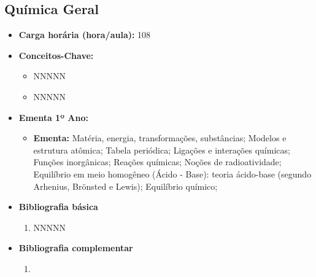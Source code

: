 \documentclass[11pt,fleqn]{book} %
\begin{document}
\subsection{Química Geral}\label{disc:quimica}
\begin{itemize}
	\item \textbf{Carga horária (hora/aula):} 108
	\item \textbf{Conceitos-Chave:}
	\begin{itemize}
		\item NNNNN
		\item NNNNN
	\end{itemize}
	\item \textbf{Ementa 1º Ano:}
	\begin{itemize}	
		\item \textbf{Ementa:} 
		Matéria, energia, transformações, substâncias;
		Modelos e estrutura atômica;
		Tabela periódica;
		Ligações e interações químicas;
		Funções inorgânicas;
		Reações químicas;
		Noções de radioatividade;
		Equilíbrio em meio homogêneo (Ácido - Base): teoria ácido-base (segundo Arhenius, Brönsted e Lewis);
		Equilíbrio químico;
	\end{itemize}
	\item \textbf{Bibliografia básica}
	\begin{enumerate}
		\item NNNNN
	\end{enumerate}
	\item \textbf{Bibliografia complementar}
	\begin{enumerate}
		\item 
	\end{enumerate}	
\end{itemize}


\newpage
\end{document}

